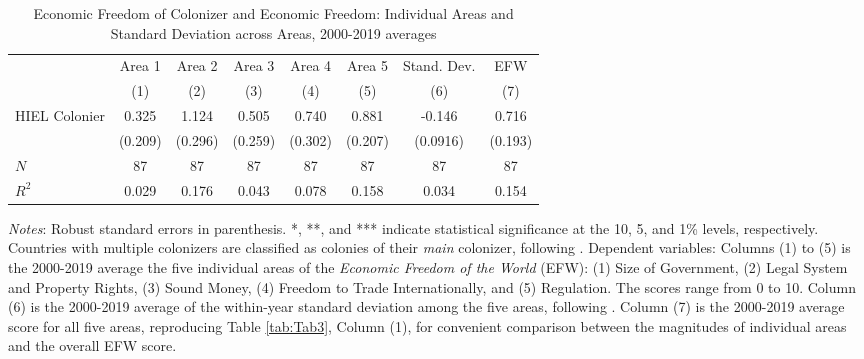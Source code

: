 \begin{sidewaystable}[h!]
\begin{threeparttable}
\begin{center}
\begin{minipage}{\textwidth}
\small
\caption{Economic Freedom of Colonizer and Economic Freedom: Individual Areas and Standard Deviation across Areas, 2000-2019 averages}
\label{tab:TabB1}
\begin{tabular*}{\textwidth}{@{\extracolsep{\fill}}lccccccc@{\extracolsep{\fill}}}
\hline\hline
            &\multicolumn{1}{c}{Area 1}&\multicolumn{1}{c}{Area 2}&\multicolumn{1}{c}{Area 3}&\multicolumn{1}{c}{Area 4}&\multicolumn{1}{c}{Area 5}&\multicolumn{1}{c}{Stand. Dev.}&\multicolumn{1}{c}{EFW}\\
            &\multicolumn{1}{c}{(1)}&\multicolumn{1}{c}{(2)}&\multicolumn{1}{c}{(3)}&\multicolumn{1}{c}{(4)}&\multicolumn{1}{c}{(5)}&\multicolumn{1}{c}{(6)}&\multicolumn{1}{c}{(7)}\\
\hline
HIEL Colonier &       0.325         &       1.124\sym{***}&       0.505\sym{*}  &       0.740\sym{**} &       0.881\sym{***}&      -0.146         &       0.716\sym{***}\\
            &     (0.209)         &     (0.296)         &     (0.259)         &     (0.302)         &     (0.207)         &    (0.0916)         &     (0.193)         \\
[0.25em]
\hline
\(N\)       &          87         &          87         &          87         &          87         &          87         &          87         &          87         \\
\(R^{2}\)   &       0.029         &       0.176         &       0.043         &       0.078         &       0.158         &       0.034         &       0.154         \\
\hline\hline
\end{tabular*}
\begin{tablenotes}
\small
\item \textit{Notes}: Robust standard errors in parenthesis. *, **, and *** indicate statistical significance at the 10, 5, and 1\% levels, respectively. Countries with multiple colonizers are classified as colonies of their \textit{main} colonizer, following \cite{laporta1999quality}. Dependent variables: Columns (1) to (5) is the 2000-2019 average the five individual areas of the \textit{Economic Freedom of the World} (EFW): (1) Size of Government, (2) Legal System and Property Rights, (3) Sound Money, (4) Freedom to Trade Internationally, and (5) Regulation. The scores range from 0 to 10. Column (6) is the 2000-2019 average of the within-year standard deviation among the five areas, following \cite{bolen2020does}. Column (7) is the 2000-2019 average score for all five areas, reproducing Table \ref{tab:Tab3}, Column (1), for convenient comparison between the magnitudes of individual areas and the overall EFW score.
\end{tablenotes}
\end{minipage}
\end{center}
\end{threeparttable}
\end{sidewaystable}